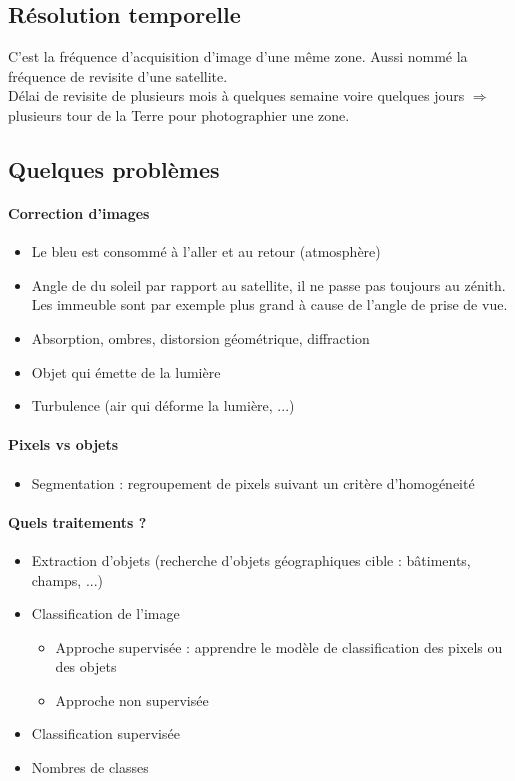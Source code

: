 \documentclass[11pt,a4paper]{article}
\begin{document}
	\subsection{Résolution temporelle}
	
	C'est la fréquence d'acquisition d'image d'une même zone. Aussi nommé la fréquence de revisite d'une satellite.\\
	
	Délai de revisite de plusieurs mois à quelques semaine voire quelques jours $\Rightarrow$ plusieurs tour de la Terre pour photographier une zone.
	
	\newpage
	
	\subsection{Quelques problèmes}
	
	\paragraph{Correction d'images}
	\begin{itemize}
		\item Le bleu est consommé à l'aller et au retour (atmosphère)
		\item Angle de du soleil par rapport au satellite, il ne passe pas toujours au zénith. Les immeuble sont par exemple plus grand à cause de l'angle de prise de vue.
		\item Absorption, ombres, distorsion géométrique, diffraction
		\item Objet qui émette de la lumière
		\item Turbulence (air qui déforme la lumière, ...)
	\end{itemize}
	
	\paragraph{Pixels vs objets}
	\begin{itemize}
		\item Segmentation : regroupement de pixels suivant un critère d'homogéneité
	\end{itemize}
	\paragraph{Quels traitements ?}
	\begin{itemize}
		\item Extraction d'objets (recherche d'objets géographiques cible : bâtiments, champs, ...)
		\item Classification de l'image
			\begin{itemize}
			\item Approche supervisée : apprendre le modèle de classification des pixels ou des objets
			\item Approche non supervisée
			\end{itemize}
		\item Classification supervisée
		\item Nombres de classes
	\end{itemize}
\end{document}
